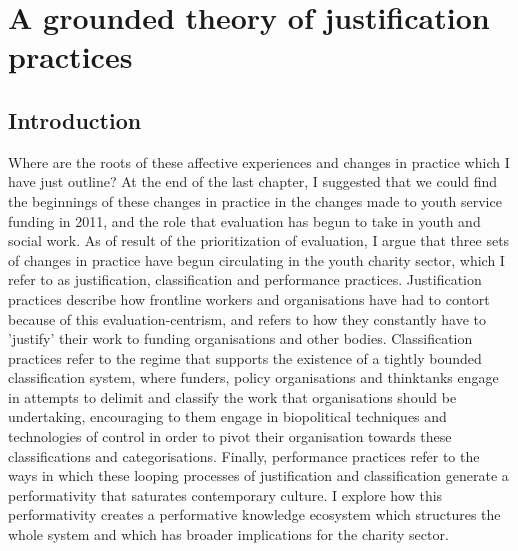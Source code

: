 \chapter{A grounded theory of justification practices}
\label{6}

\section{Introduction}
\label{sec:}

Where are the roots of these affective experiences and changes in practice which I have just outline? At the end of the last chapter, I suggested that we could find the beginnings of these changes in practice in the changes made to youth service funding in 2011, and the role that evaluation has begun to take in youth and social work. As of result of the prioritization of evaluation, I argue that three sets of changes in practice have begun circulating in the youth charity sector, which I refer to as justification, classification and performance practices. Justification practices describe how frontline workers and organisations have had to contort because of this evaluation-centrism, and refers to how they constantly have to 'justify' their work to funding organisations and other bodies. Classification practices refer to the regime that supports the existence of a tightly bounded classification system, where funders, policy organisations and thinktanks engage in attempts to delimit and classify the work that organisations should be undertaking, encouraging to them engage in biopolitical techniques and technologies of control in order to pivot their organisation towards these classifications and categorisations. Finally, performance practices refer to the ways in which these looping processes of justification and classification generate a performativity that saturates contemporary culture. I explore how this performativity creates a performative knowledge ecosystem which structures the whole system and which has broader implications for the charity sector. 

